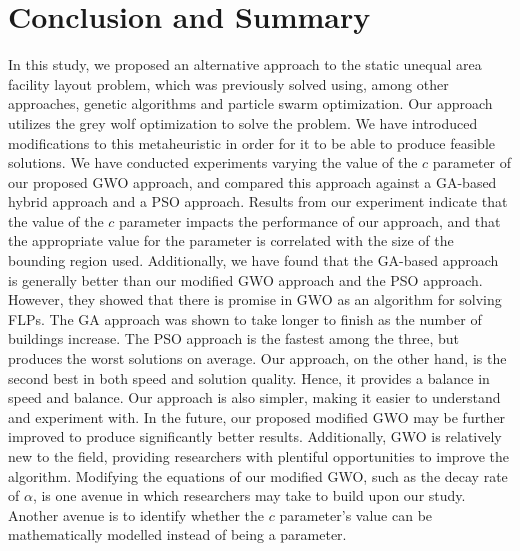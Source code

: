 \chapter{Conclusion and Summary}

In this study, we proposed an alternative approach to the static unequal area facility layout problem, which was previously solved using, among other approaches, genetic algorithms and particle swarm optimization. Our approach utilizes the grey wolf optimization to solve the problem. We have introduced modifications to this metaheuristic in order for it to be able to produce feasible solutions. We have conducted experiments varying the value of the $c$ parameter of our proposed GWO approach, and compared this approach against a GA-based hybrid approach and a PSO approach. Results from our experiment indicate that the value of the $c$ parameter impacts the performance of our approach, and that the appropriate value for the parameter is correlated with the size of the bounding region used. Additionally, we have found that the GA-based approach is generally better than our modified GWO approach and the PSO approach. However, they showed that there is promise in GWO as an algorithm for solving FLPs. The GA approach was shown to take longer to finish as the number of buildings increase. The PSO approach is the fastest among the three, but produces the worst solutions on average. Our approach, on the other hand, is the second best in both speed and solution quality. Hence, it provides a balance in speed and balance. Our approach is also simpler, making it easier to understand and experiment with. In the future, our proposed modified GWO may be further improved to produce significantly better results. Additionally, GWO is relatively new to the field, providing researchers with plentiful opportunities to improve the algorithm. Modifying the equations of our modified GWO, such as the decay rate of $\alpha$, is one avenue in which researchers may take to build upon our study. Another avenue is to identify whether the $c$ parameter's value can be mathematically modelled instead of being a parameter.
